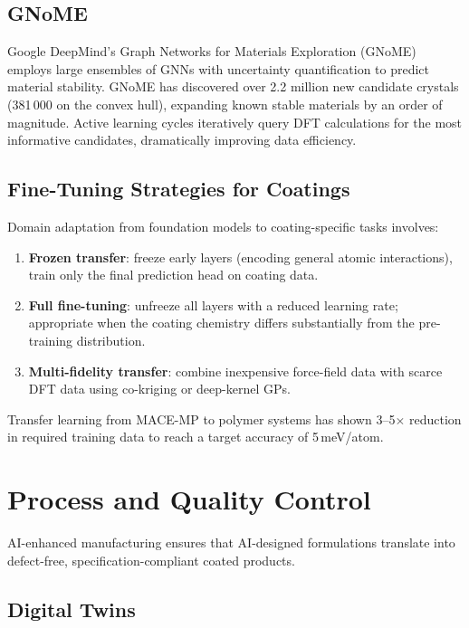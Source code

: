 \documentclass[11pt,a4paper]{article}
\begin{document}
\subsection{GNoME}

Google DeepMind's Graph Networks for Materials Exploration (GNoME) employs large ensembles of GNNs with uncertainty quantification to predict material stability.
GNoME has discovered over 2.2 million new candidate crystals (381\,000 on the convex hull), expanding known stable materials by an order of magnitude.
Active learning cycles iteratively query DFT calculations for the most informative candidates, dramatically improving data efficiency.

\subsection{Fine-Tuning Strategies for Coatings}

Domain adaptation from foundation models to coating-specific tasks involves:
\begin{enumerate}[nosep]
  \item \textbf{Frozen transfer}: freeze early layers (encoding general atomic interactions), train only the final prediction head on coating data.
  \item \textbf{Full fine-tuning}: unfreeze all layers with a reduced learning rate; appropriate when the coating chemistry differs substantially from the pre-training distribution.
  \item \textbf{Multi-fidelity transfer}: combine inexpensive force-field data with scarce DFT data using co-kriging or deep-kernel GPs.
\end{enumerate}
Transfer learning from MACE-MP to polymer systems has shown 3--5$\times$ reduction in required training data to reach a target accuracy of 5\,meV/atom.

\section{Process and Quality Control}
\label{sec:process}

AI-enhanced manufacturing ensures that AI-designed formulations translate into defect-free, specification-compliant coated products.

\subsection{Digital Twins}
\end{document}
